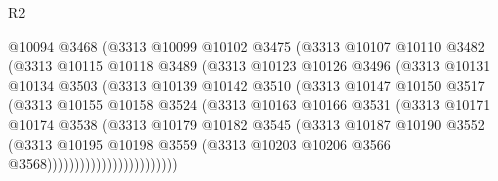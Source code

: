 \begin{lexlean}{R2}
\begin{coremodule}
                        @10094
                        @3468
                        (@3313
                          @10099
                          @10102
                          @3475
                          (@3313
                            @10107
                            @10110
                            @3482
                            (@3313
                              @10115
                              @10118
                              @3489
                              (@3313
                                @10123
                                @10126
                                @3496
                                (@3313
                                  @10131
                                  @10134
                                  @3503
                                  (@3313
                                    @10139
                                    @10142
                                    @3510
                                    (@3313
                                      @10147
                                      @10150
                                      @3517
                                      (@3313
                                        @10155
                                        @10158
                                        @3524
                                        (@3313
                                          @10163
                                          @10166
                                          @3531
                                          (@3313
                                            @10171
                                            @10174
                                            @3538
                                            (@3313
                                              @10179
                                              @10182
                                              @3545
                                              (@3313
                                                @10187
                                                @10190
                                                @3552
                                                (@3313
                                                  @10195
                                                  @10198
                                                  @3559
                                                  (@3313
                                                    @10203
                                                    @10206
                                                    @3566
                                                    @3568))))))))))))))))))))))))

\end{coremodule}
\end{lexlean}
